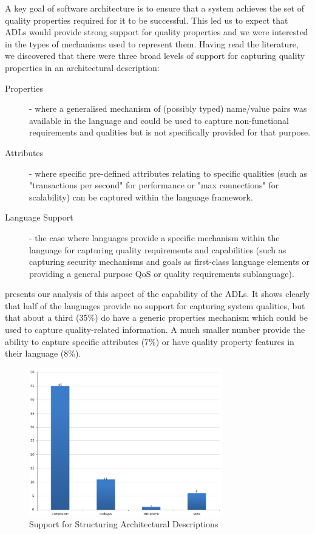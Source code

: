 A key goal of software architecture is to ensure that a system achieves the set of quality properties required for it to be successful.  This led us to expect that ADLs would provide strong support for quality properties and we were interested in the types of mechanisms used to represent them.  Having read the literature, we discovered that there were three broad levels of support for capturing quality properties in an architectural description:
\begin{description}
	\item[Properties] - where a generalised mechanism of (possibly typed) name/value pairs was available in the language and could be used to capture non-functional requirements and qualities but is not specifically provided for that purpose.
	\item[Attributes] - where specific pre-defined attributes relating to specific qualities (such as "transactions per second" for performance or "max connections" for scalability) can be captured within the language framework.
	\item[Language Support] - the case where languages provide a specific mechanism within the language for capturing quality requirements and capabilities (such as capturing security mechanisms and goals as first-class language elements or providing a general purpose QoS or quality requirements sublanguage).
\end{description}

 presents our analysis of this aspect of the capability of the ADLs.  It shows clearly that half of the languages provide no support for capturing system qualities, but that about a third (35\%) do have a generic properties mechanism which could be used to capture quality-related information.  A much smaller number provide the ability to capture specific attributes (7\%) or have quality property features in their language (8\%).

\begin{figure}
\centering
\includegraphics[width=0.75\textwidth]{Figures/litreview-adl-structuring}
\caption{Support for Structuring Architectural Descriptions}
\label{figure:litreview-adl-structuring}
\end{figure}

